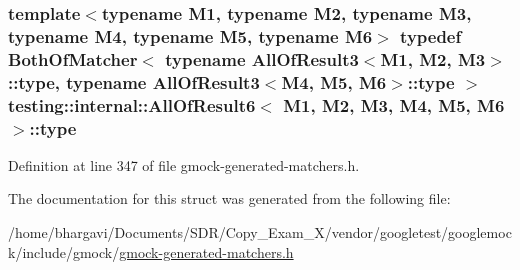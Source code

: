 \subsubsection[{\texorpdfstring{type}{type}}]{\setlength{\rightskip}{0pt plus 5cm}template$<$typename M1, typename M2, typename M3, typename M4, typename M5, typename M6$>$ typedef {\bf Both\+Of\+Matcher}$<$ typename {\bf All\+Of\+Result3}$<$M1, M2, M3$>$\+::{\bf type}, typename {\bf All\+Of\+Result3}$<$M4, M5, M6$>$\+::{\bf type} $>$ {\bf testing\+::internal\+::\+All\+Of\+Result6}$<$ M1, M2, M3, M4, M5, M6 $>$\+::{\bf type}}\hypertarget{structtesting_1_1internal_1_1_all_of_result6_a5385655911ce2c1d3fccd802c1754139}{}\label{structtesting_1_1internal_1_1_all_of_result6_a5385655911ce2c1d3fccd802c1754139}


Definition at line 347 of file gmock-\/generated-\/matchers.\+h.



The documentation for this struct was generated from the following file\+:\begin{DoxyCompactItemize}
\item 
/home/bhargavi/\+Documents/\+S\+D\+R/\+Copy\+\_\+\+Exam\+\_\+X/vendor/googletest/googlemock/include/gmock/\hyperlink{gmock-generated-matchers_8h}{gmock-\/generated-\/matchers.\+h}\end{DoxyCompactItemize}

